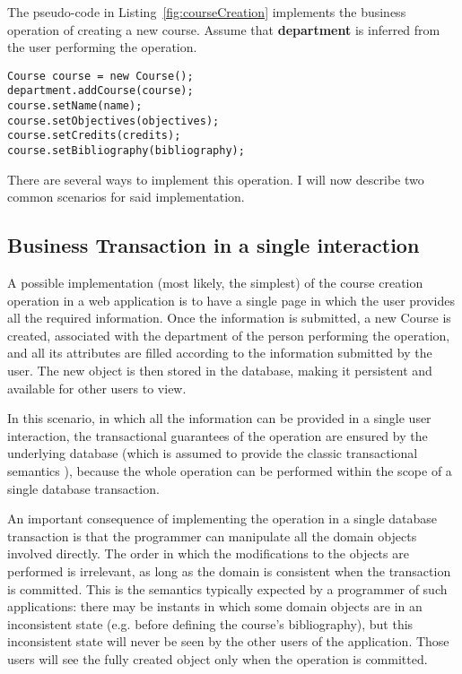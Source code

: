 The pseudo-code in Listing~\ref{fig:courseCreation} implements the
business operation of creating a new course. Assume that {\bf
  department} is inferred from the user performing the operation.

\begin{lstlisting}[float]
Course course = new Course();
department.addCourse(course);
course.setName(name);
course.setObjectives(objectives);
course.setCredits(credits);
course.setBibliography(bibliography);
\end{lstlisting}

There are several ways to implement this operation. I will now
describe two common scenarios for said implementation.

\subsection{Business Transaction in a single interaction}

A possible implementation (most likely, the simplest) of the course
creation operation in a web application is to have a single page in
which the user provides all the required information. Once the
information is submitted, a new Course is created, associated with the
department of the person performing the operation, and all its
attributes are filled according to the information submitted by the
user. The new object is then stored in the database, making it
persistent and available for other users to view.

In this scenario, in which all the information can be provided in a
single user interaction, the transactional guarantees of the operation
are ensured by the underlying database (which is assumed to provide
the classic transactional semantics \cite{gray1981transaction}),
because the whole operation can be performed within the scope of a
single database transaction.

An important consequence of implementing the operation in a single
database transaction is that the programmer can manipulate all the
domain objects involved directly. The order in which the modifications
to the objects are performed is irrelevant, as long as the domain is
consistent when the transaction is committed. This is the semantics
typically expected by a programmer of such applications: there may be
instants in which some domain objects are in an inconsistent state
(e.g. before defining the course's bibliography), but this
inconsistent state will never be seen by the other users of the
application. Those users will see the fully created object only when
the operation is committed.

